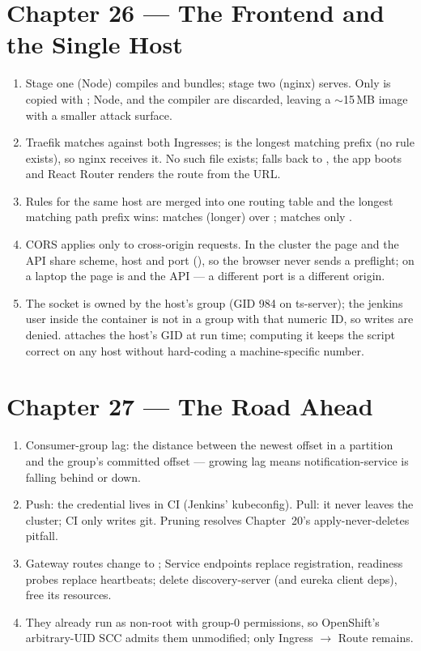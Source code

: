 \section*{Chapter 26 --- The Frontend and the Single Host}
\begin{enumerate}
  \item Stage one (Node) compiles and bundles; stage two (nginx) serves.
  Only  is copied with ; Node,
   and the compiler are discarded, leaving a
  $\sim$15\,MB image with a smaller attack surface.
  \item Traefik matches  against both Ingresses;
  \code{/} is the longest matching prefix (no  rule
  exists), so nginx receives it. No such file exists;
   falls back to
  , the app boots and React Router renders the route
  from the URL.
  \item Rules for the same host are merged into one routing table and
  the longest matching path prefix wins:  matches
   (longer) over \code{/};  matches only
  \code{/}.
  \item CORS applies only to cross-origin requests. In the cluster the
  page and the API share scheme, host and port (),
  so the browser never sends a preflight; on a laptop the page is
   and the API  --- a
  different port is a different origin.
  \item The socket is owned by the host's  group (GID 984
  on ts-server); the jenkins user inside the container is not in a
  group with that numeric ID, so writes are denied. 
  attaches the host's GID at run time; computing it keeps the script
  correct on any host without hard-coding a machine-specific number.
\end{enumerate}

\section*{Chapter 27 --- The Road Ahead}
\begin{enumerate}
  \item Consumer-group lag: the distance between the newest offset in a
  partition and the group's committed offset --- growing lag means
  notification-service is falling behind or down.
  \item Push: the credential lives in CI (Jenkins' kubeconfig).
  Pull: it never leaves the cluster; CI only writes git. Pruning
  resolves Chapter~20's apply-never-deletes pitfall.
  \item Gateway routes change  to
  ; Service endpoints replace registration,
  readiness probes replace heartbeats; delete discovery-server (and
  eureka client deps), free its resources.
  \item They already run as non-root with group-0 permissions, so
  OpenShift's arbitrary-UID SCC admits them unmodified; only
  Ingress $\rightarrow$ Route remains.
\end{enumerate}

